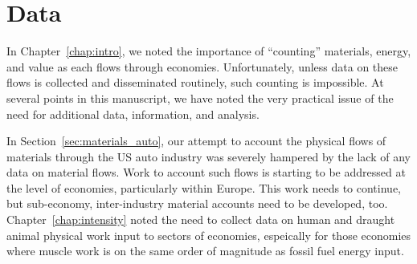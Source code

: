 % 
% 
% 


\section{Data}
\label{sec:Data}

In Chapter~\ref{chap:intro}, 
we noted the importance of ``counting''
materials, energy, and value as each flows through economies.  
Unfortunately, unless data on these flows 
is collected and disseminated routinely, 
such counting is impossible.
At several points in this manuscript,
we have noted the very practical issue of the
need for additional data, information, and analysis.

In Section~\ref{sec:materials_auto},
our attempt to account the physical flows of 
materials through the US auto industry was
severely hampered by the lack of any data on
material flows.
Work to account such flows is starting to be
addressed at the level of economies,
particularly within Europe.\cite{EUROSTAT2011}
This work needs to continue, but
sub-economy, inter-industry material accounts need to be developed, too.
Chapter~\ref{chap:intensity} noted the need to collect
data on human and draught animal physical work input to 
sectors of economies, espeically for those economies where 
muscle work is on the same order of magnitude 
as fossil fuel energy input.

